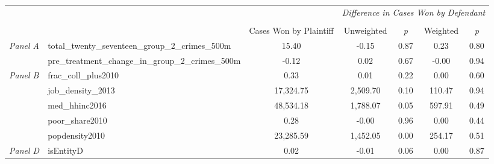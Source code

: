 \begin{tabular}{llccccc}
\toprule
 &  & \textit{} & \multicolumn{4}{c}{\textit{Difference in Cases Won by Defendant}} \\
\cline{4-7}
\\
 &  & Cases Won by Plaintiff & Unweighted & \emph{p} & Weighted & \emph{p} \\
\midrule
\multirow[c]{2}{3cm}{\textit{Panel A}} & total_twenty_seventeen_group_2_crimes_500m & 15.40 & -0.15 & 0.87 & 0.23 & 0.80 \\
 & pre_treatment_change_in_group_2_crimes_500m & -0.12 & 0.02 & 0.67 & -0.00 & 0.94 \\
\cline{1-7}
\multirow[c]{5}{3cm}{\textit{Panel B}} & frac_coll_plus2010 & 0.33 & 0.01 & 0.22 & 0.00 & 0.60 \\
 & job_density_2013 & 17,324.75 & 2,509.70 & 0.10 & 110.47 & 0.94 \\
 & med_hhinc2016 & 48,534.18 & 1,788.07 & 0.05 & 597.91 & 0.49 \\
 & poor_share2010 & 0.28 & -0.00 & 0.96 & 0.00 & 0.44 \\
 & popdensity2010 & 23,285.59 & 1,452.05 & 0.00 & 254.17 & 0.51 \\
\cline{1-7}
\textit{Panel D} & isEntityD & 0.02 & -0.01 & 0.06 & 0.00 & 0.87 \\
\cline{1-7}
\bottomrule
\end{tabular}
